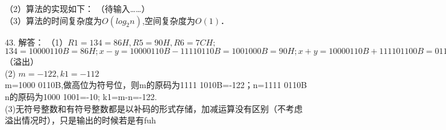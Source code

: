 （2）算法的实现如下：
（待输入……） \\

（3）算法的时间复杂度为$O(log_2n)$,空间复杂度为$O(1)$．


43. 解答：
（1）$R1=134=86H, R5=90H, R6=7CH;$ \\
$134=1000 0110B=86H; x-y=1000 0110B-1111 0110B=1001 000B=90H; x+y=1000 0110B+1111 01100B=0111 1100B$（溢出） \\
(2) $m=-122, k1=-112$ \\
m=1000 0110B,做高位为符号位，则m的原码为1111 1010B=-122；n=1111 0110B \\
n的原码为1000 1001=-10; k1=m-n=-122. \\
(3)无符号整数和有符号整数都是以补码的形式存储，加减运算没有区别（不考虑溢出情况时），只是输出的时候若是有fuh

